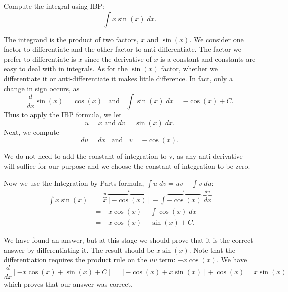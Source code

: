\documentclass{ximera}
\begin{document}
\begin{example}[example 1] %
Compute the integral using IBP:
  \[
  \int x\sin(x) \;dx.
  \]
  
  The integrand is the product of two factors, $x$ and $\sin(x)$.  We consider one factor to differentiate and the other factor to anti-differentiate.
  The factor we prefer to differentiate is $x$ since the derivative of $x$ is a constant and constants are easy to deal with in integrals.
  As for the $\sin(x)$ factor, whether we differentiate it or anti-differentiate it makes little difference.  In fact, only a change in sign occurs,
  as 
  \[\frac{d}{dx}{\sin(x)} = \cos(x) \;\;  \text{ and }\;\;   \int \sin(x) \;dx = -\cos(x) + C.\]
  Thus to apply the IBP formula, we let
  \[u=x \text{  and  }  dv = \sin(x) \;dx.\]
  Next, we compute
  \[du = dx  \;\;  \text{  and  }\;\;    v = -\cos(x).\]
  \begin{remark} 
  We do not need to add the constant of integration to v, as any anti-derivative will suffice 
  for our purpose and we choose the constant of integration to be zero.
  \end{remark}
  Now we use the Integration by Parts formula, $\int u\;dv = uv-\int v\; du$:
  \begin{align*}
  \int x\sin(x) &= \overbrace{x}^{u}\overbrace{[-\cos(x)]}^{v} - \int \overbrace{-\cos(x)}^{v} \;\overbrace{dx}^{du}\\
                &= -x\cos(x) + \int \cos(x) \;dx\\
                &= -x\cos(x) + \sin(x) + C.
 \end{align*}
 
  We have found an answer, but at this stage we should prove that it is the correct answer by differentiating it.  The result should be $x\sin(x)$.
  Note that the differentiation requires the product rule on the $uv$ term: $-x\cos(x)$.
  We have
  \[
  \frac{d}{dx}{\left[-x\cos(x) + \sin(x) + C\right]} = [-\cos(x) + x\sin(x)] + \cos(x) = x\sin(x)
  \]
  which proves that our answer was correct.
  
    
\end{example}

\end{document}

